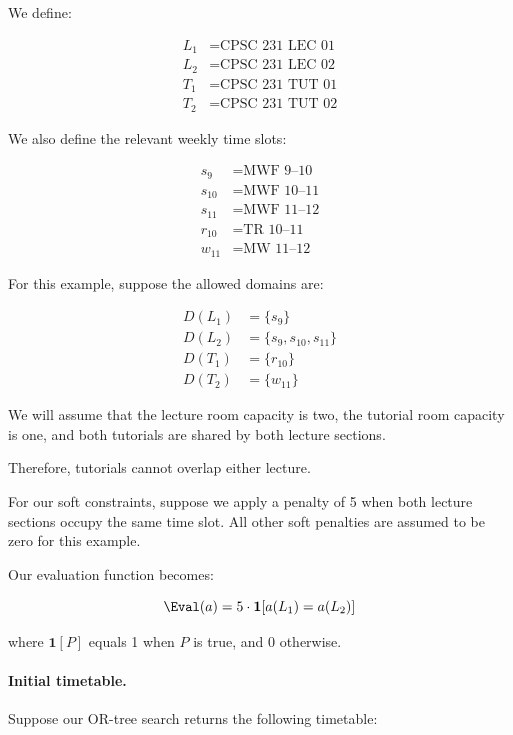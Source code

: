 We define:

\begin{align}
L_1 &= \text{CPSC 231 LEC 01}\\
L_2 &= \text{CPSC 231 LEC 02}\\
T_1 &= \text{CPSC 231 TUT 01}\\
T_2 &= \text{CPSC 231 TUT 02}
\end{align}

We also define the relevant weekly time slots:

\begin{align}
s_9 &= \text{MWF 9--10}\\
s_{10} &= \text{MWF 10--11}\\
s_{11} &= \text{MWF 11--12}\\
r_{10} &= \text{TR 10--11}\\
w_{11} &= \text{MW 11--12}
\end{align}

For this example, suppose the allowed domains are:

\begin{align}
D(L_1)&=\{s_9\}\\
D(L_2)&=\{s_9,s_{10},s_{11}\}\\
D(T_1)&=\{r_{10}\}\\
D(T_2)&=\{w_{11}\}
\end{align}

We will assume that the lecture room capacity is two, the tutorial room capacity is one, and both tutorials are shared by both lecture sections.

Therefore, tutorials cannot overlap either lecture.

For our soft constraints, suppose we apply a penalty of 5 when both lecture sections occupy the same time slot. All other soft penalties are assumed to be zero for this example.

Our evaluation function becomes:

\begin{equation}
    \Eval(a)=
    5\cdot\mathbf{1}[a(L_1)=a(L_2)]
\end{equation}

where $\mathbf{1}[P]$ equals 1 when $P$ is true, and 0 otherwise.

\paragraph{Initial timetable.}

Suppose our OR-tree search returns the following timetable:

